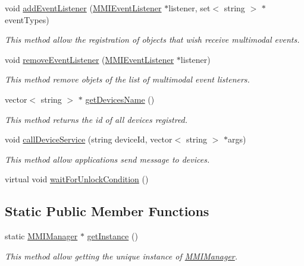 \begin{DoxyCompactItemize}
void \hyperlink{classbr_1_1ufscar_1_1lince_1_1mmi_1_1MMIManager_a6cd07df71e304c7257c91ce145ada8f5}{addEventListener} (\hyperlink{classbr_1_1ufscar_1_1lince_1_1mmi_1_1MMIEventListener}{MMIEventListener} $\ast$listener, set$<$ string $>$ $\ast$eventTypes)
\begin{DoxyCompactList}\small\item\em This method allow the registration of objects that wish receive multimodal events. \item\end{DoxyCompactList}\item 
void \hyperlink{classbr_1_1ufscar_1_1lince_1_1mmi_1_1MMIManager_af301df4426b81e014b718a0a9cfb398f}{removeEventListener} (\hyperlink{classbr_1_1ufscar_1_1lince_1_1mmi_1_1MMIEventListener}{MMIEventListener} $\ast$listener)
\begin{DoxyCompactList}\small\item\em This method remove objets of the list of multimodal event listeners. \item\end{DoxyCompactList}\item 
vector$<$ string $>$ $\ast$ \hyperlink{classbr_1_1ufscar_1_1lince_1_1mmi_1_1MMIManager_a10ea6c549e2381748e8f6dbab2181942}{getDevicesName} ()
\begin{DoxyCompactList}\small\item\em This method returns the id of all devices registred. \item\end{DoxyCompactList}\item 
void \hyperlink{classbr_1_1ufscar_1_1lince_1_1mmi_1_1MMIManager_afaf755202a19c63ec903ff1d70362126}{callDeviceService} (string deviceId, vector$<$ string $>$ $\ast$args)
\begin{DoxyCompactList}\small\item\em This method allow applications send message to devices. \item\end{DoxyCompactList}\item 
virtual void \hyperlink{classbr_1_1ufscar_1_1lince_1_1mmi_1_1MMIManager_a1b1bf42389517969c28bfc0062e05f91}{waitForUnlockCondition} ()
\end{DoxyCompactItemize}
\subsection*{Static Public Member Functions}
\begin{DoxyCompactItemize}
\item 
static \hyperlink{classbr_1_1ufscar_1_1lince_1_1mmi_1_1MMIManager}{MMIManager} $\ast$ \hyperlink{classbr_1_1ufscar_1_1lince_1_1mmi_1_1MMIManager_ab14c6d4285139f01cc5d67a5e650b9c4}{getInstance} ()
\begin{DoxyCompactList}\small\item\em This method allow getting the unique instance of \hyperlink{classbr_1_1ufscar_1_1lince_1_1mmi_1_1MMIManager}{MMIManager}. \item\end{DoxyCompactList}\end{DoxyCompactItemize}



